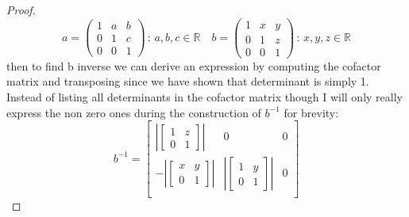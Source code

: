\documentclass[11pt]{article}
\theoremstyle{definition}  %
\newcommand{\R}{\mathbb{R}}
\begin{document}
\begin{proof}
    \[
      a=  \left( \begin{array}{ccc} 1 & a & b \\ 0 & 1 & c  \\ 0 & 0 & 1 \end{array} \right) \, : \,  a, b, c \in \R  \quad b=\left( \begin{array}{ccc} 1 & x & y \\ 0 & 1 & z  \\ 0 & 0 & 1 \end{array} \right) \, : \,  x, y, z \in \R
    \] then to find b inverse we can derive an expression by computing the cofactor matrix and transposing since we have shown that determinant is simply 1.
    Instead of listing all determinants in the cofactor matrix though I will only really express the non zero ones during the construction of $b^{-1}$ for brevity:
    \[
    b^{-1}=
      \begin{bmatrix}
        \left|\begin{bmatrix}
          1&z\\0&1
        \end{bmatrix}\right|&0&0\\

        -\left|\begin{bmatrix}
          x&y\\0&1
        \end{bmatrix}\right|&\left|\begin{bmatrix}
          1&y\\0&1
        \end{bmatrix}\right|&0\\


\end{bmatrix}\]
\end{proof}
\end{document}
